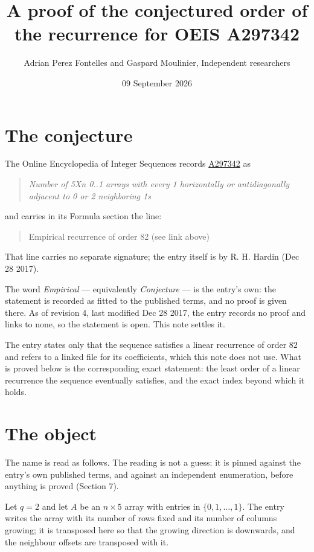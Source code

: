 \documentclass[11pt]{article}
\title{A proof of the conjectured order of the recurrence for OEIS A297342}
\author{Adrian Perez Fontelles and Gaspard Moulinier, Independent researchers}
\date{09 September 2026}
\theoremstyle{definition}
\begin{document}
\maketitle
\section{The conjecture}

The Online Encyclopedia of Integer Sequences records \href{https://oeis.org/A297342}{A297342} as

\begin{quote}\itshape Number of 5Xn 0..1 arrays with every 1 horizontally or antidiagonally adjacent to 0 or 2 neighboring 1s\end{quote}

and carries in its Formula section the line:

\begin{quote}\ttfamily Empirical recurrence of order 82 (see link above)\end{quote}

That line carries no separate signature; the entry itself is by R. H. Hardin (Dec 28 2017).

The word {\itshape Empirical} --- equivalently {\itshape Conjecture} --- is the entry's own: the statement is recorded as fitted to the published terms, and no proof is given there. As of revision 4, last modified Dec 28 2017, the entry records no proof and links to none, so the statement is open. This note settles it.

The entry states only that the sequence satisfies a linear recurrence of order $82$ and refers to a linked file for its coefficients, which this note does not use. What is proved below is the corresponding exact statement: the least order of a linear recurrence the sequence eventually satisfies, and the exact index beyond which it holds.

\section{The object}

The name is read as follows. The reading is not a guess: it is pinned against the entry's own published terms, and against an independent enumeration, before anything is proved (Section 7).

Let $q = 2$ and let $A$ be an $n \times 5$ array with entries in $\{0,1,\dots,1\}$. The entry writes the array with its number of rows fixed and its number of columns growing; it is transposed here so that the growing direction is downwards, and the neighbour offsets are transposed with it.
\end{document}
